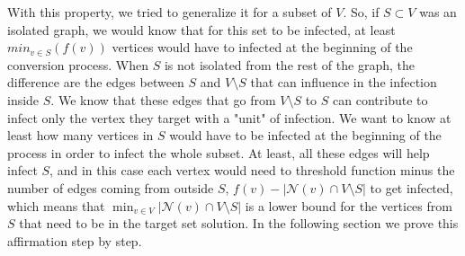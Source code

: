 With this property, we tried to generalize it for a subset of $V$. So, if $S \subset V$ was an isolated graph, we would know that for this set to be infected, at least $min_{v \in S}(f(v))$ vertices would have to infected at the beginning of the conversion process. When $S$ is not isolated from the rest of the graph, the difference are the edges between $S$ and $V \setminus S$ that can influence in the infection inside $S$. We know that these edges that go from $V \setminus S$ to $S$ can contribute to infect only the vertex they target with a "unit" of infection. We want to know at least how many vertices in $S$ would have to be infected at the beginning of the process in order to infect the whole subset. At least, all these edges will help infect $S$, and in this case each vertex would need to threshold function minus the number of edges coming from outside $S$,  $f(v) - |\mathcal{N}(v) \cap V \setminus S|$ to get infected, which means that $\min_{v \in V} |\mathcal{N}(v) \cap V \setminus S|$ is a lower bound for the vertices from $S$ that need to be in the target set solution. In the following section we prove this affirmation step by step.
